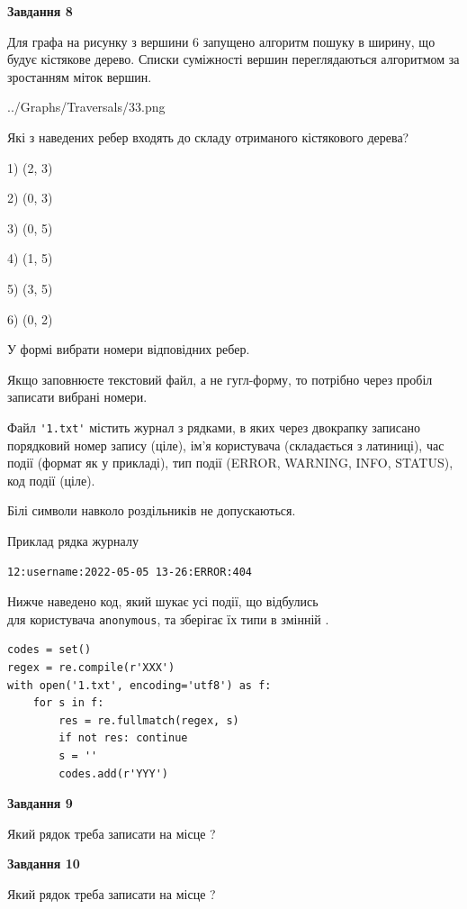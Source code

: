 \documentclass[12pt, ukrainian]{article}
\def\code#1{\Verb!#1!}
\begin{document}
{\begin {large}
{\begin {center}\textbf{Завдання 8}\end {center}}\par
Для графа на рисунку з вершини 6 запущено алгоритм пошуку в ширину, що будує кістякове дерево. Списки суміжності вершин переглядаються алгоритмом за зростанням міток вершин.\par
\begin{center}
	{../Graphs/Traversals/33.png}
\end{center}
\par Які з наведених ребер входять до складу отриманого кістякового дерева?\par
1) (2, 3)\par
2) (0, 3)\par
3) (0, 5)\par
4) (1, 5)\par
5) (3, 5)\par
6) (0, 2)\par
{\vskip 15pt} У формі вибрати номери відповідних ребер.


Якщо заповнюєте текстовий файл, а не гугл-форму, то потрібно через пробіл записа\-ти вибрані номери.\par
\newpage


Файл \code{'1.txt'} містить журнал з рядками, в яких через двокрапку записано поряд\-ко\-вий номер запису (ціле), ім'я користувача (складається з латиниці), час події (фор\-мат як у прикладі), тип події (ERROR, WARNING, INFO, STATUS), код події (ціле).

Білі символи навколо роздільників не допускаються.

Приклад рядка журналу



\begin{verbatim}
12:username:2022-05-05 13-26:ERROR:404
\end{verbatim}


Нижче наведено код, який шукає усі події, що відбулись\\ для користувача \code{anonymous}, та зберігає їх типи в змінній .



\begin{verbatim}
codes = set()
regex = re.compile(r'XXX')
with open('1.txt', encoding='utf8') as f:
    for s in f:
        res = re.fullmatch(regex, s)
        if not res: continue
        s = ''
        codes.add(r'YYY')
\end{verbatim}


{\begin {center}\textbf{Завдання 9}\end {center}}\par
Який рядок треба записати на місце  ?\par
\vspace{5mm}


{\begin {center}\textbf{Завдання 10}\end {center}}\par
Який рядок треба записати на місце  ?\par


\newpage


\end {large}}
\end{document}
